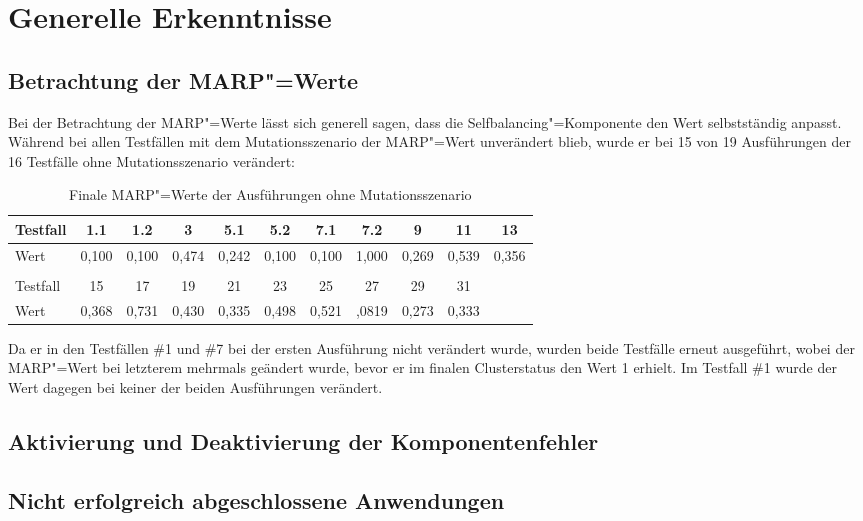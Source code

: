 \section{Generelle Erkenntnisse}
\label{sec:generalResults}


\subsection{Betrachtung der \ac{MARP}"=Werte}
\label{sec:marpValueResults}

Bei der Betrachtung der \ac{MARP}"=Werte lässt sich generell sagen, dass die Selfbalancing"=Komponente den Wert selbstständig anpasst.
Während bei allen Testfällen mit dem Mutationsszenario der \ac{MARP}"=Wert unverändert blieb, wurde er bei 15 von 19 Ausführungen der 16 Testfälle ohne Mutationsszenario verändert:

\begin{table}[h]
    \begin{tabular}{l|c|c|c|c|c|c|c|c|c|c}
    	Testfall &  1.1  &  1.2  &   3   &  5.1  &  5.2  &  7.1  &  7.2  &   9   &  11   &  13   \\ \hline
    	Wert     & 0,100 & 0,100 & 0,474 & 0,242 & 0,100 & 0,100 & 1,000 & 0,269 & 0,539 & 0,356 \\
        \multicolumn{11}{c}{} \\
    	Testfall &  15   &  17   &  19   &  21   &  23   &  25   &  27   &  29   &  31   &  \\ \hline
    	Wert     & 0,368 & 0,731 & 0,430 & 0,335 & 0,498 & 0,521 & ,0819 & 0,273 & 0,333 &
    \end{tabular}
    \caption{Finale \ac{MARP}"=Werte der Ausführungen ohne Mutationsszenario}
    \label{tab:finalMarpValues}
\end{table}

Da er in den Testfällen \#1 und \#7 bei der ersten Ausführung nicht verändert wurde, wurden beide Testfälle erneut ausgeführt, wobei der \ac{MARP}"=Wert bei letzterem mehrmals geändert wurde, bevor er im finalen Clusterstatus den Wert 1 erhielt.
Im Testfall \#1 wurde der Wert dagegen bei keiner der beiden Ausführungen verändert.

\subsection{Aktivierung und Deaktivierung der Komponentenfehler}
\label{sec:faultInjectionEval}


\subsection{Nicht erfolgreich abgeschlossene Anwendungen}
\label{sec:failedAppsEval}





